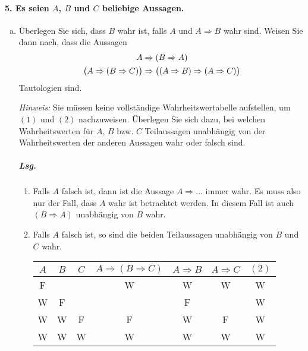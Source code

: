 \documentclass{scrreprt}
\begin{document}
\paragraph{5. Es seien $A$, $B$ und $C$ beliebige Aussagen.}
\begin{enumerate}[a)]
\item Überlegen Sie sich, dass $B$ wahr ist, falls $A$ und $A \Rightarrow B$
  wahr sind.
  Weisen Sie dann nach, dass die Aussagen
  \renewcommand{\theequation}{\arabic{equation}}
  \begin{align}
    A &\Rightarrow \qty(B \Rightarrow A) \\
    \qty\big(A \Rightarrow \qty(B \Rightarrow C))
      &\Rightarrow \qty\big(\qty(A \Rightarrow B) \Rightarrow \qty(A \Rightarrow C))
  \end{align}
  Tautologien sind.

  \emph{Hinweis:} Sie müssen keine vollständige Wahrheitswertabelle aufstellen,
  um $(1)$ und $(2)$ nachzuweisen.
  Überlegen Sie sich dazu, bei welchen Wahrheitswerten für $A$, $B$ bzw. $C$
  Teilaussagen unabhängig von der Wahrheitswerten der anderen Aussagen wahr oder
  falsch sind.

  \subparagraph{Lsg.}
  \begin{enumerate}[(1)]
  \item Falls $A$ falsch ist, dann ist die Aussage $A \Rightarrow \ldots$ immer
    wahr.
    Es muss also nur der Fall, dass $A$ wahr ist betrachtet werden.
    In diesem Fall ist auch $(B \Rightarrow A)$ unabhängig von $B$ wahr.

  \item Falls $A$ falsch ist, so sind die beiden Teilaussagen unabhängig von
    $B$ und $C$ wahr.
    \begin{center}
      \begin{tabular}{c | c | c | c | c | c | c}
        $A$ & $B$ & $C$ & $A \Rightarrow (B \Rightarrow C)$ & $A \Rightarrow B$ & $A \Rightarrow C$ & $(2)$ \\
        \hline
        F & & & W & W & W & W \\
        W & F & & & F & & W \\
        W & W & F & F & W & F & W \\
        W & W & W & W & W & W & W
      \end{tabular}
    \end{center}
  \end{enumerate}
\end{enumerate}
\end{document}
